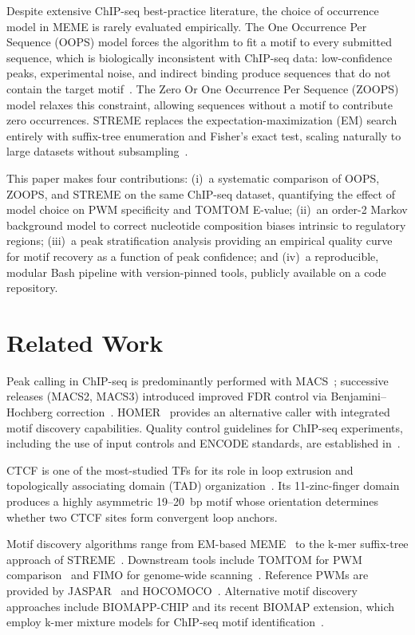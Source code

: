 \documentclass[12pt]{article}
\begin{document}
Despite extensive ChIP-seq best-practice literature, the choice of occurrence
model in MEME is rarely evaluated empirically. The One Occurrence Per Sequence
(OOPS) model forces the algorithm to fit a motif to every submitted sequence,
which is biologically inconsistent with ChIP-seq data: low-confidence peaks,
experimental noise, and indirect binding produce sequences that do not contain
the target motif~\cite{bailey1995}. The Zero Or One Occurrence Per Sequence
(ZOOPS) model relaxes this constraint, allowing sequences without a motif to
contribute zero occurrences. STREME replaces the expectation-maximization (EM)
search entirely with suffix-tree enumeration and Fisher's exact test, scaling
naturally to large datasets without subsampling~\cite{bailey2021}.

This paper makes four contributions: (i)~a systematic comparison of OOPS,
ZOOPS, and STREME on the same ChIP-seq dataset, quantifying the effect of model
choice on PWM specificity and TOMTOM E-value; (ii)~an order-2 Markov background
model to correct nucleotide composition biases intrinsic to regulatory regions;
(iii)~a peak stratification analysis providing an empirical quality curve for
motif recovery as a function of peak confidence; and (iv)~a reproducible,
modular Bash pipeline with version-pinned tools, publicly available on a code
repository.

\section{Related Work}

Peak calling in ChIP-seq is predominantly performed with MACS~\cite{zhang2008};
successive releases (MACS2, MACS3) introduced improved FDR control via
Benjamini--Hochberg correction~\cite{feng2012}. HOMER~\cite{heinz2010} provides
an alternative caller with integrated motif discovery capabilities. Quality
control guidelines for ChIP-seq experiments, including the use of input controls
and ENCODE standards, are established in~\cite{landt2012}.

CTCF is one of the most-studied TFs for its role in loop extrusion and
topologically associating domain (TAD) organization~\cite{davidson2023,sun2022}.
Its 11-zinc-finger domain produces a highly asymmetric 19--20~bp motif whose
orientation determines whether two CTCF sites form convergent loop anchors.

Motif discovery algorithms range from EM-based MEME~\cite{bailey1995} to
the k-mer suffix-tree approach of STREME~\cite{bailey2021}. Downstream tools
include TOMTOM for PWM comparison~\cite{gupta2007} and FIMO for genome-wide
scanning~\cite{fimo2011}. Reference PWMs are provided by JASPAR~\cite{jaspar2024}
and HOCOMOCO~\cite{hocomoco2013}. Alternative motif discovery approaches
include BIOMAPP-CHIP and its recent BIOMAP extension, which employ k-mer mixture
models for ChIP-seq motif identification~\cite{caldonazzo2018,biomapp2024}.
\end{document}
